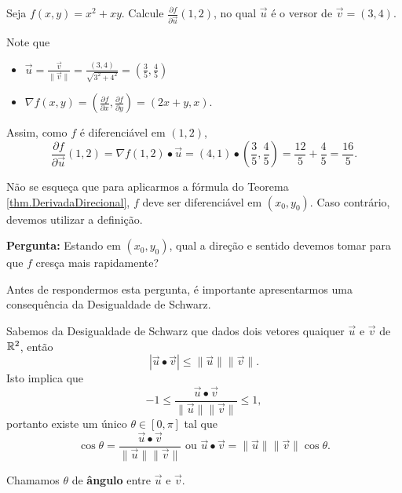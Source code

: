 \begin{example}
    Seja \(f(x,y) = x^2 + xy\). Calcule \(\frac{\partial f}{\partial \overrightarrow{u}}(1,2)\), no qual \(\overrightarrow{u}\) é o versor de \(\overrightarrow{v} = (3,4)\).

    Note que
        \begin{itemize}
            \item \(\overrightarrow{u} = \frac{\overrightarrow{v}}{\|\overrightarrow{v}\|} = \frac{(3,4)}{\sqrt{3^2 + 4^2}} = \left( \frac{3}{5},\frac{4}{5} \right)\)
            \item \(\nabla f(x,y) = \left( \frac{\partial f}{\partial x},\frac{\partial f}{\partial y} \right) = (2x + y,x)\).
        \end{itemize}
    Assim, como \(f\) é diferenciável em \((1,2)\), \[\frac{\partial f}{\partial \overrightarrow{u}}(1,2) = \nabla f(1,2)\bullet\overrightarrow{u} = (4,1)\bullet\left( \frac{3}{5},\frac{4}{5} \right) = \frac{12}{5} + \frac{4}{5} = \frac{16}{5}.\]
\end{example}

\begin{remark}
    Não se esqueça que para aplicarmos a fórmula do Teorema \ref{thm.DerivadaDirecional}, \(f\) deve ser diferenciável em \((x_0,y_0)\). Caso contrário, devemos utilizar a definição.
\end{remark}

\textbf{Pergunta: } Estando em \((x_0,y_0)\), qual a direção e sentido devemos tomar para que \(f\) cresça mais rapidamente?

Antes de respondermos esta pergunta, é importante apresentarmos uma consequência da Desigualdade de Schwarz.

\begin{remark}
    Sabemos da Desigualdade de Schwarz que dados dois vetores quaiquer \(\overrightarrow{u}\) e \(\overrightarrow{v}\) de \(\mathbb{R}^2\), então \[|\overrightarrow{u}\bullet\overrightarrow{v}| \leq \|\overrightarrow{u}\| \|\overrightarrow{v}\|.\] Isto implica que \[-1 \leq \frac{\overrightarrow{u}\bullet\overrightarrow{v}}{\|\overrightarrow{u}\| \|\overrightarrow{v}\|} \leq 1,\] portanto existe um único \(\theta\in [0,\pi]\) tal que \[\cos\theta = \frac{\overrightarrow{u}\bullet\overrightarrow{v}}{\|\overrightarrow{u}\| \|\overrightarrow{v}\|} \text{ ou } \overrightarrow{u}\bullet\overrightarrow{v} = \|\overrightarrow{u}\| \|\overrightarrow{v}\| \cos\theta.\]

    Chamamos \(\theta\) de \textbf{ângulo} entre \(\overrightarrow{u}\) e \(\overrightarrow{v}\).
\end{remark}

